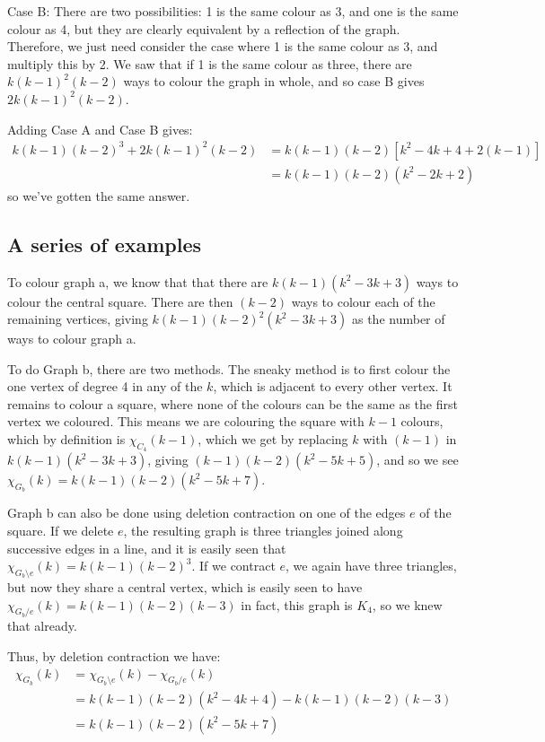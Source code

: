 \documentclass{amsart}
\begin{document}
Case B: There are two possibilities: 1 is the same colour as 3, and one is the same colour as 4, but they are clearly equivalent by a reflection of the graph.  Therefore, we just need consider the case where 1 is the same colour as 3, and multiply this by 2.  We saw that if 1 is the same colour as three, there are $k(k-1)^2(k-2)$ ways to colour the graph in whole, and so case B gives $2k(k-1)^2(k-2)$.

Adding Case A and Case B gives:
\begin{align*}
  k(k-1)(k-2)^3+2k(k-1)^2(k-2)&=k(k-1)(k-2)[k^2-4k+4+2(k-1)] \\
  &=k(k-1)(k-2)(k^2-2k+2)
  \end{align*}
so we've gotten the same answer.


\subsection{A series of examples}

To colour graph a, we know that that there are $k(k-1)(k^2-3k+3)$ ways to colour the central square.  There are then $(k-2)$ ways to colour each of the remaining vertices, giving $k(k-1)(k-2)^2(k^2-3k+3)$ as the number of ways to colour graph a.

To do Graph b, there are two methods.  The sneaky method is to first colour the one vertex of degree 4 in any of the $k$, which is adjacent to every other vertex.  It remains to colour a square, where none of the colours can be the same as the first vertex we coloured.  This means we are colouring the square with $k-1$ colours, which by definition is $\chi_{C_4}(k-1)$, which we get by replacing $k$ with $(k-1)$ in $k(k-1)(k^2-3k+3)$, giving $(k-1)(k-2)(k^2-5k+5)$, and so we see $\chi_{G_b}(k)=k(k-1)(k-2)(k^2-5k+7)$.

Graph b can also be done using deletion contraction on one of the edges $e$ of the square.  If we delete $e$, the resulting graph is three triangles joined along successive edges in a line, and it is easily seen that $\chi_{G_b\setminus e}(k)=k(k-1)(k-2)^3$.  If we contract $e$, we again have three triangles, but now they share a central vertex, which is easily seen to have $\chi_{G_b/e}(k)=k(k-1)(k-2)(k-3)$ in fact, this graph is $K_4$, so we knew that already.

Thus, by deletion contraction we have:
\begin{align*}
  \chi_{G_b}(k)&=\chi_{G_b\setminus e}(k)-\chi_{G_b/e}(k) \\
  &=k(k-1)(k-2)(k^2-4k+4)-k(k-1)(k-2)(k-3) \\
  &=k(k-1)(k-2)(k^2-5k+7)
\end{align*}
\end{document}

